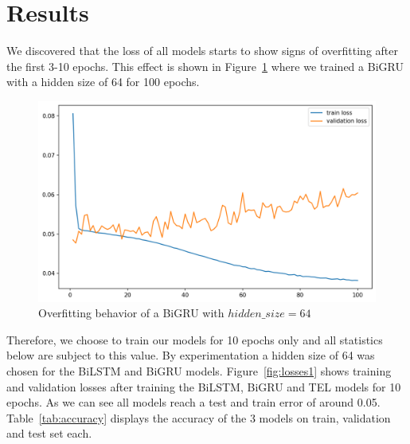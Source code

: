 \documentclass[utf8x]{ctexart}
\begin{document}
\section{Results}

We discovered that the loss of all models  starts to show signs of overfitting after the first 3-10 epochs. This effect is shown in Figure~\ref{fig:overfitting} where we trained a BiGRU with a hidden size of 64 for 100 epochs.

\begin{figure}[htb]
  \centering
  \includegraphics[width=\textwidth]{../images/BiGRU100_trainlosses.png}
  \caption{Overfitting behavior of a BiGRU with $hidden\_size = 64$}
  \label{fig:overfitting}
\end{figure}




Therefore, we choose to train our models for 10 epochs only and all statistics below are subject to this value. By experimentation a hidden size of 64 was chosen for the BiLSTM and BiGRU models.
Figure~\ref{fig:losses1} shows training and validation losses after training the BiLSTM, BiGRU and TEL models for 10 epochs. As we can see all models reach a test and train error of around 0.05. Table~\ref{tab:accuracy} displays the accuracy of the 3 models on train, validation and test set each.
\end{document}
